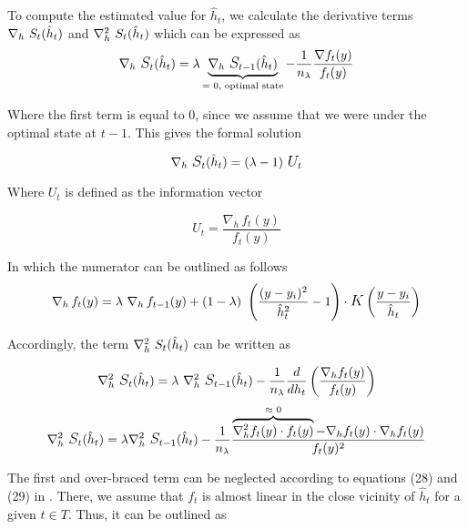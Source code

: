 To compute the estimated value for $\hat{h}_{t}$, we calculate the derivative terms $ \nabla_h \ \mathlarger{S}_t (\hat{h}_{t})$ and $\nabla^2_h \ \mathlarger{S}_t (\hat{h}_{t})$ which can be expressed as
\begin{equation}
     \nabla_h \ \mathlarger{S}_t (\hat{h}_{t}) =  \lambda\underbrace{\nabla_h \ \mathlarger{S}_{t-1} (\hat{h}_{t})}_{\text{= 0, optimal state}} - \frac{1}{n_{\lambda}} \frac{\nabla f_t (y)}{f_t (y)}
\end{equation}

Where the first term is equal to 0, since we assume that we were under the optimal state at $t-1$. This gives the formal solution

\begin{equation}
     \nabla_h \ \mathlarger{S}_t (\hat{h}_{t}) =  (\lambda - 1) \ \mathlarger{U}_t
\end{equation}

Where $U_t$ is defined as the information vector

\begin{equation}
     U_t =  \frac{\nabla _h \, f_t (y)}{f_t (y)}
\end{equation}

In which the numerator can be outlined as follows
\begin{equation}
    \nabla_{h}\, f_t (y) = \lambda \ \nabla_{h}\,f_{t-1}(y) + (1-\lambda) \ \left(\frac{(y - y_{i})^2}{\hat{h}_{t}^2} - 1\right) \cdot \mathlarger{K}\left(\frac{y - y_{i}}{\hat{h}_{t}}\right)
\end{equation}


Accordingly, the term $\nabla^2_h \ \mathlarger{S}_t (\hat{h}_{t})$ can be written as 

\begin{equation}
    \nabla^2_h \ \mathlarger{S}_t (\hat{h}_{t}) = \lambda \ \nabla^2_h \ \mathlarger{S}_{t-1} (\hat{h}_{t}) - \frac{1}{n_{\lambda}} \frac{d}{dh_{t}} \left(\frac{\nabla_h f_t (y)}{f_t (y)}\right)
\end{equation}
\begin{equation}
      \nabla^2_h \ \mathlarger{S}_t (\hat{h}_{t}) = \lambda \nabla^2_h \ \mathlarger{S}_{t-1} (\hat{h}_t) - \frac{1}{n_{\lambda}} \frac{\overbrace{\nabla^2_h f_t (y) \cdot f_t (y)}^{\text{$\approx$ 0}} - \nabla_h f_t (y) \cdot \nabla_h f_t (y) }{f_t (y) ^2}
\end{equation}

The first and over-braced term can be neglected according to equations (28) and (29) in \cite{Pinson_Madsen_2012}. There, we assume that $f_t$ is almost linear in the close vicinity of $\hat{h}_t$ for a given $t \in T$. Thus, it can be outlined as 

